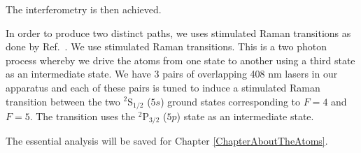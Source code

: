 The interferometry is then achieved. 


In order to produce two distinct paths, we uses stimulated Raman transitions as done by Ref.\ \cite{kasevichChu1991}. We use stimulated Raman transitions. This is a two photon process whereby we drive the atoms from one state to another using a third state as an intermediate state. We have 3 pairs of overlapping 408 nm lasers in our apparatus and each of these pairs is tuned to induce a stimulated Raman transition between the two $^2$S$_{1/2}$ ($5s$) ground states corresponding to $F=4$ and $F=5$. The transition uses the $^2$P$_{3/2}$ ($5p$) state as an intermediate state. 


The essential analysis will be saved for Chapter \ref{ChapterAboutTheAtoms}.




